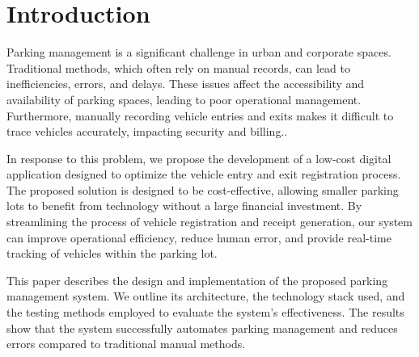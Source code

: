 \section{Introduction}

Parking management is a significant challenge in urban and corporate spaces. Traditional methods, which often rely on manual records, can lead to inefficiencies, errors, and delays. These issues affect the accessibility and availability of parking spaces, leading to poor operational management. Furthermore, manually recording vehicle entries and exits makes it difficult to trace vehicles accurately, impacting security and billing.\cite{chien2020lowcost}.


In response to this problem, we propose the development of a low-cost digital application designed to optimize the vehicle entry and exit registration process. The proposed solution is designed to be cost-effective, allowing smaller parking lots to benefit from technology without a large financial investment. By streamlining the process of vehicle registration and receipt generation, our system can improve operational efficiency, reduce human error, and provide real-time tracking of vehicles within the parking lot.

This paper describes the design and implementation of the proposed parking management system. We outline its architecture, the technology stack used, and the testing methods employed to evaluate the system’s effectiveness. The results show that the system successfully automates parking management and reduces errors compared to traditional manual methods.